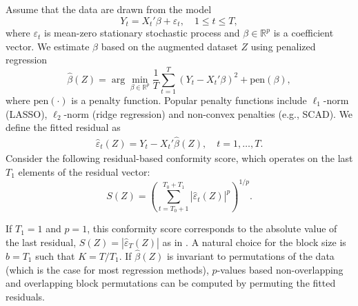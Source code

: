 \documentclass[final,12pt]{colt2018} %
\begin{document}
Assume that the data are drawn from the model
\begin{equation}
Y_t=X_t'\beta+\varepsilon_t, \quad 1\le t \le T, \label{eq: linear model}
\end{equation}
where $\varepsilon_t$ is mean-zero stationary stochastic process and $\beta \in \mathbb{R}^p$ is a coefficient vector. We estimate $\beta$ based on the augmented dataset $Z$ using penalized regression
\[
\hat\beta (Z) = \arg\min_{\beta\in \mathbb{R}^p} \frac{1}{T}\sum_{t=1}^T\left(Y_t-X_t'\beta \right)^2+ \text{pen}(\beta),
\]
where $\text{pen}(\cdot)$ is a penalty function. Popular penalty functions include $\ell_1$-norm (LASSO), $\ell_2$-norm (ridge regression) and non-convex penalties (e.g., SCAD). 
We define  the fitted residual as
\begin{eqnarray*}
\hat{\varepsilon}_t(Z) =Y_t-X_t'\hat\beta (Z), \quad t=1,\dots,T.
\end{eqnarray*}
Consider the following residual-based conformity score, which operates on the last $T_1$ elements of the residual vector:
\begin{equation}\label{eq: def S pen reg}
S(Z)=  \left(\sum_{t=T_0+1}^{T_0+T_1} \left|\hat{\varepsilon}_{t}(Z) \right|^p\right)^{1/p}.
\end{equation}


If $T_1=1$ and $p=1$, this conformity score corresponds to the absolute value of the last residual, $S(Z)=|\hat{\varepsilon}_T(Z)|$ as in \citet{lei2017distributionfree}. A natural choice for the block size is $b=T_1$ such that $K=T/T_1$. If $\hat{\beta}(Z)$ is invariant to permutations of the data (which is the case for most regression methods), $p$-values based non-overlapping and overlapping block permutations can be computed by permuting the fitted residuals.


\end{document}
